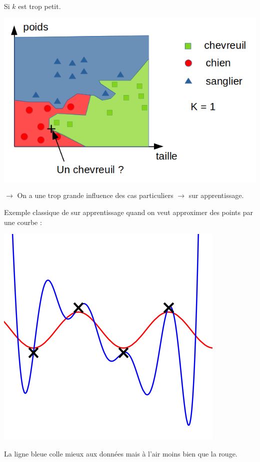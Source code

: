 \begin{com}
	Si $k$ est trop petit.
\end{com}
\begin{center}
	\includegraphics[scale=0.4]{Developpements/k voisins/graphe2.png}
\end{center}

$\to$ On a une trop grande influence des cas particuliers $\to$ sur apprentissage.

Exemple classique de sur apprentissage quand on veut approximer des points par une courbe : \\
\begin{minipage}{0.5\linewidth}
\includegraphics[scale=0.4]{Developpements/k voisins/sur_apprentissage.png}
\end{minipage}\begin{minipage}{0.5\linewidth}
La ligne bleue colle mieux aux données mais à l'air moins bien que la rouge.
\end{minipage}

